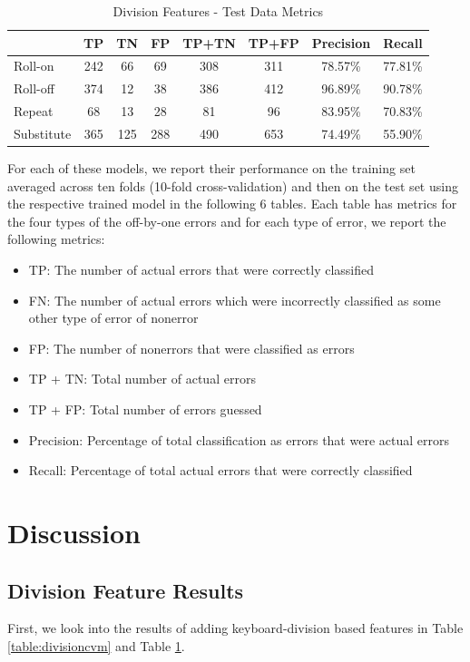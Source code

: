 \documentclass[letterpaper, 10 pt, conference]{ieeeconf}  %
\begin{document}
\begin{table}[h]
\begin{center}
\begin{tabular}{|l|c|c|c|c|c|c|c|} \hline
& TP & TN & FP & TP+TN & TP+FP & Precision & Recall \\ \hline
Roll-on & 242 & 66 & 69 & 308 & 311 & 78.57\% & 77.81\% \\ \hline
Roll-off & 374 & 12 & 38 & 386 & 412 & 96.89\% & 90.78\% \\ \hline
Repeat & 68 & 13 & 28 & 81 & 96 & 83.95\% & 70.83\% \\ \hline
Substitute & 365 & 125 & 288 & 490 & 653 & 74.49\% & 55.90\% \\ \hline
\end{tabular}
\caption{Division Features - Test Data Metrics}
\label{table:divisiontdm}
\end{center}
\end{table}

For each of these models, we report their performance on the training set averaged across ten folds (10-fold cross-validation) and then on the test set using the respective trained model in the following 6 tables. Each table has metrics for the four types of the off-by-one errors and for each type of error, we report the following metrics:
\begin{itemize}
\item TP: The number of actual errors that were correctly classified
\item FN: The number of actual errors which were incorrectly classified as some other type of error of nonerror
\item FP: The number of nonerrors that were classified as errors
\item TP + TN: Total number of actual errors
\item TP + FP: Total number of errors guessed
\item Precision: Percentage of total classification as errors that were actual errors
\item Recall: Percentage of total actual errors that were correctly classified
\end{itemize}

\section{Discussion}

\subsection{Division Feature Results}
First, we look into the results of adding keyboard-division based features in Table \ref{table:divisioncvm} and Table \ref{table:divisiontdm}. 
\end{document}
